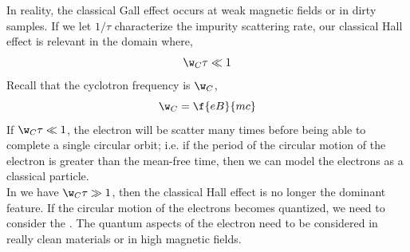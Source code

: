 \documentclass{article}
\begin{document}
\begin{center}
\end{center}

In reality, the classical Gall effect occurs at weak magnetic fields or in dirty samples.
If we let $1/\tau$ characterize the impurity scattering rate, our classical Hall effect is relevant in the domain where,
\[ \w_{C} \tau \ll 1 \]
Recall that the cyclotron frequency is $\w_C$,
\[ \w_C = \f{eB}{mc} \]
If $\w_{C} \tau \ll 1$, the electron will be scatter many times before being able to complete a single circular orbit; i.e. if the period of the circular motion of the electron is greater than the mean-free time, then we can model the electrons as a classical particle.\\

In we have $\w_{C} \tau \gg 1$, then the classical Hall effect is no longer the dominant feature. If the circular motion of the electrons becomes quantized, we need to consider the . The quantum aspects of the electron need to be considered in really clean materials or in high magnetic fields.\\
\end{document}
